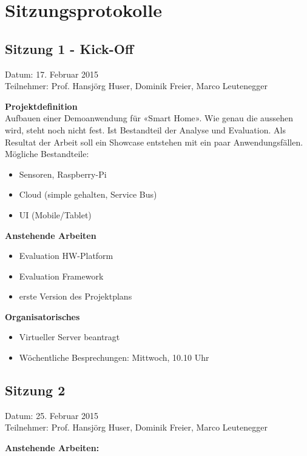 \chapter{Sitzungsprotokolle}
\label{chap:Sitzungsprotokolle}
\section{Sitzung 1 - Kick-Off}
Datum: 17. Februar 2015 \\
Teilnehmer: Prof. Hansjörg Huser, Dominik Freier, Marco Leutenegger

\textbf{Projektdefinition} \\
Aufbauen einer Demoanwendung für «Smart Home». Wie genau die aussehen wird, steht noch nicht fest. Ist Bestandteil der Analyse und Evaluation. Als Resultat der Arbeit soll ein Showcase entstehen mit ein paar Anwendungsfällen. \\
Mögliche Bestandteile:
\begin{itemize}
	\item Sensoren, Raspberry-Pi
	\item Cloud (simple gehalten, Service Bus)
	\item UI (Mobile/Tablet)
\end{itemize}

\textbf{Anstehende Arbeiten}
\begin{itemize}
	\item Evaluation HW-Platform
	\item Evaluation Framework
	\item erste Version des Projektplans
\end{itemize}

\textbf{Organisatorisches}

\begin{itemize}
	\item Virtueller Server beantragt
	\item Wöchentliche Besprechungen: Mittwoch, 10.10 Uhr
\end{itemize}

\section{Sitzung 2}
Datum: 25. Februar 2015 \\
Teilnehmer: Prof. Hansjörg Huser, Dominik Freier, Marco Leutenegger

\textbf{Anstehende Arbeiten:} \\
